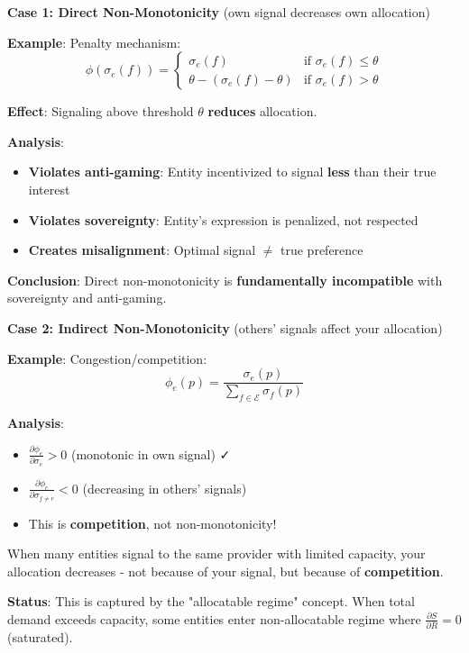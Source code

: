 \documentclass[11pt,a4paper]{article}
\theoremstyle{definition}
\theoremstyle{remark}
\newcommand{\E}{\mathcal{E}}
\begin{document}
\textbf{Case 1: Direct Non-Monotonicity} (own signal decreases own allocation)

\textbf{Example}: Penalty mechanism:
\[ \phi(\sigma_e(f)) = \begin{cases}
\sigma_e(f) & \text{if } \sigma_e(f) \le \theta \\
\theta - (\sigma_e(f) - \theta) & \text{if } \sigma_e(f) > \theta
\end{cases} \]

\textbf{Effect}: Signaling above threshold $\theta$ \textbf{reduces} allocation.

\textbf{Analysis}:
\begin{itemize}
\item \textbf{Violates anti-gaming}: Entity incentivized to signal \textbf{less} than their true interest
\item \textbf{Violates sovereignty}: Entity's expression is penalized, not respected
\item \textbf{Creates misalignment}: Optimal signal $\ne$ true preference
\end{itemize}

\textbf{Conclusion}: Direct non-monotonicity is \textbf{fundamentally incompatible} with sovereignty and anti-gaming.

\medskip

\textbf{Case 2: Indirect Non-Monotonicity} (others' signals affect your allocation)

\textbf{Example}: Congestion/competition:
\[ \phi_e(p) = \frac{\sigma_e(p)}{\sum_{f \in \E} \sigma_f(p)} \]

\textbf{Analysis}:
\begin{itemize}
\item $\frac{\partial \phi_e}{\partial \sigma_e} > 0$ (monotonic in own signal) ✓
\item $\frac{\partial \phi_e}{\partial \sigma_{f \ne e}} < 0$ (decreasing in others' signals)
\item This is \textbf{competition}, not non-monotonicity!
\end{itemize}

When many entities signal to the same provider with limited capacity, your allocation decreases - not because of your signal, but because of \textbf{competition}.

\textbf{Status}: This is captured by the "allocatable regime" concept. When total demand exceeds capacity, some entities enter non-allocatable regime where $\frac{\partial S}{\partial R} = 0$ (saturated).
\end{document}
